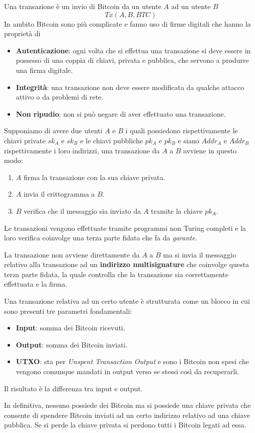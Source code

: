 Una transazione
\`e un invio di Bitcoin da un utente $A$ ad un utente $B$
\[ Tx(A, B, BTC) \]
In ambito Bitcoin sono pi\`u complicate e fanno uso di firme digitali che hanno la propriet\`a di
\begin{itemize}
	\item \textbf{Autenticazione}: ogni volta che si effettua una transazione si deve essere in possesso di una coppia
	      di chiavi, privata e pubblica, che servono a produrre una firma digitale.
	\item \textbf{Integrit\`a}: una transazione non deve essere modificata da qualche attacco attivo o da problemi di
	      rete.
	\item \textbf{Non ripudio}: non si pu\`o negare di aver effettuato una transazione.
\end{itemize}
Supponiamo di avere due utenti $A$ e $B$ i quali possiedono rispettivamente le chiavi private $sk_A$ e $sk_B$ e le
chiavi pubbliche $pk_A$ e $pk_B$ e siano $Addr_A$ e $Addr_B$ rispettivamente i loro indirizzi, una transazione da $A$
a $B$ avviene in questo modo:
\begin{enumerate}
	\item $A$ firma la transazione con la sua chiave privata.
	\item $A$ invia il crittogramma a $B$.
	\item $B$ verifica che il messaggio sia inviato da $A$ tramite la chiave $pk_A$.
\end{enumerate}
Le transazioni vengono effettuate tramite programmi non Turing completi e la loro verifica coinvolge una terza parte
fidata che fa da \emph{garante}.

La transazione non avviene direttamente da $A$ a $B$ ma si invia il messaggio relativo alla transazione ad un
\textbf{indirizzo multisignature} che coinvolge questa terza parte fidata, la quale controlla che la transazione
sia correttamente effettuata e la firma.

Una transazione relativa ad un certo utente \`e strutturata come un blocco in cui sono presenti tre parametri
fondamentali:
\begin{itemize}
	\item \textbf{Input}: somma dei Bitcoin ricevuti.
	\item \textbf{Output}: somma dei Bitcoin inviati.
	\item \textbf{UTXO}: sta per \emph{Unspent Transaction Output} e sono i Bitcoin non spesi che vengono comunque
	      mandati in output verso se stessi cos\`i da recuperarli.
\end{itemize}
Il risultato \`e la differenza tra input e output.

In definitiva, nessuno possiede dei Bitcoin ma si possiede una chiave privata che consente di spendere Bitcoin inviati
ad un certo indirizzo relativo ad una chiave pubblica. Se si perde la chiave privata si perdono tutti i Bitcoin
legati ad essa.
